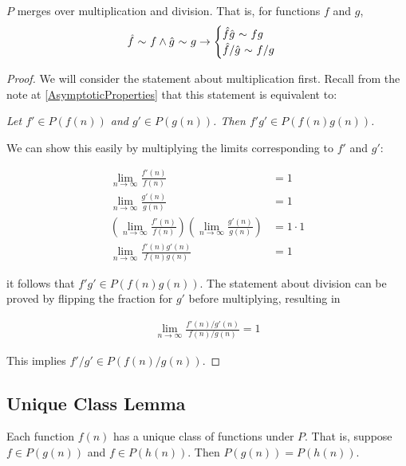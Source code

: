 \begin{theorem}
	$P$ merges over multiplication and division. That is, for functions $f$ and $g$,
	\begin{align*}
	\hat{f} \ \mathtt{\sim}\  f \land \hat{g} \ \mathtt{\sim}\  g \rightarrow \begin{cases}
	\hat{f}\hat{g} \ \mathtt{\sim}\  fg\\
	\hat{f} / \hat{g} \ \mathtt{\sim}\  f / g
	\end{cases}
	\end{align*}
\end{theorem}

\begin{proof}
	We will consider the statement about multiplication first. Recall from the note at \ref{AsymptoticProperties} that this statement is equivalent to:
	
	\textit{Let $f' \in P(f(n))$ and $g' \in P(g(n))$. Then $f'g' \in P(f(n)g(n))$.}
	
	We can show this easily by multiplying the limits corresponding to $f'$ and $g'$:
	
	\begin{align*}
	\lim_{n \to \infty} \frac{f'(n)}{f(n)} &= 1\\
	\lim_{n \to \infty} \frac{g'(n)}{g(n)} &= 1\\
	\left( \lim_{n \to \infty} \frac{f'(n)}{f(n)} \right) \left( \lim_{n \to \infty} \frac{g'(n)}{g(n)} \right) &= 1 \cdot 1\\
	\lim_{n \to \infty} \frac{f'(n)g'(n)}{f(n)g(n)} &= 1
	\end{align*}
	
	it follows that $f'g' \in P(f(n)g(n))$. The statement about division can be proved by flipping the fraction for $g'$ before multiplying, resulting in
	
	\begin{align*}
	\lim_{n \to \infty} \frac{f'(n) / g'(n)}{f(n) / g(n)} = 1
	\end{align*}
	
	This implies $f' / g' \in P(f(n) / g(n))$.
\end{proof}

\subsection{Unique Class Lemma}
\label{UniqueClassOfFunctions}

\begin{lemma}
	Each function $f(n)$ has a unique class of functions under $P$. That is, suppose $f \in P(g(n))$ and $f \in P(h(n))$. Then $P(g(n)) = P(h(n))$.
\end{lemma}

